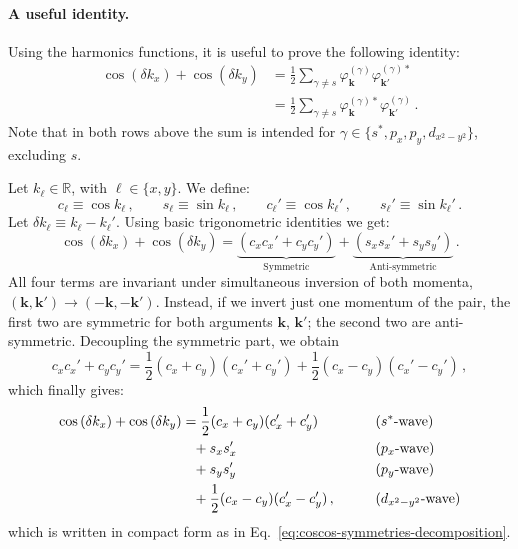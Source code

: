 \paragraph{A useful identity.}

Using the harmonics functions, it is useful to prove the following identity:
\begin{align} 
	\cos \left( \delta k_x \right)	+ \cos \left( \delta k_y  \right) &= \frac 1 2 \sum_{\gamma \neq s} \varphi_\mathbf{k}^{(\gamma)} \varphi_{\mathbf{k}'}^{(\gamma)*} \label{eq:coscos-symmetries-decomposition} \\
	&= \frac 1 2 \sum_{\gamma \neq s} \varphi_\mathbf{k}^{(\gamma)*} \varphi_{\mathbf{k}'}^{(\gamma)} \, .
\end{align}
Note that in both rows above the sum is intended for $\gamma \in \lbrace s^*, p_x, p_y, d_{x^2-y^2} \rbrace$, excluding $s$.

\begin{tabproof}

	Let $k_\ell \in \mathbb{R}$, with $\ell \in \lbrace x, y \rbrace$. We define:
	\[
		c_\ell \equiv \cos k_\ell \, ,
		\qquad
		s_\ell \equiv \sin k_\ell \, ,
		\qquad
		c_\ell' \equiv \cos	k_\ell' \, ,
		\qquad
		s_\ell' \equiv \sin k_\ell' \, .
	\]
	Let $\delta k_\ell \equiv k_\ell - k_\ell'$. Using basic trigonometric identities we get:
	\begin{equation}\label{eq:sym-asym-couplings-gap}
		\cos \left( \delta k_x \right)	+ \cos \left( \delta k_y \right) = 
		\underbrace{
			\left(c_x c_x' + c_y c_y' \right) 
		}_\text{Symmetric}
		+ \underbrace{
			\left(s_x s_x' + s_y s_y' \right)
		}_\text{Anti-symmetric} \, .
	\end{equation}
	All four terms are invariant under simultaneous inversion of both momenta, $(\mathbf{k},\mathbf{k}') \to (-\mathbf{k},-\mathbf{k}')$. Instead, if we invert just one momentum of the pair, the first two are symmetric for both arguments $\mathbf{k}$, $\mathbf{k}'$; the second two are anti-symmetric. Decoupling the symmetric part, we obtain
	\[
		c_x c_x' + c_y c_y' = \frac{1}{2} (c_x + c_y)(c_x' + c_y') + \frac{1}{2} (c_x - c_y)(c_x' - c_y') \, ,
	\]
	which finally gives:
	\[
	\begin{aligned}
		\cos \left( \delta k_x \right)	+ \cos \left( \delta k_y  \right) &= \frac{1}{2}  (c_x + c_y)(c_x' + c_y') &&\qquad\text{($s^*$-wave)} \\
		&\hphantom{=}+ s_x s_x' &&\qquad\text{($p_x$-wave)} \\
		&\hphantom{=}+ s_y s_y' &&\qquad\text{($p_y$-wave)} \\
		&\hphantom{=}+ \frac{1}{2} (c_x - c_y)(c_x' - c_y') \, , &&\qquad\text{($d_{x^2-y^2}$-wave)}
	\end{aligned}
	\]
	which is written in compact form as in Eq.~\eqref{eq:coscos-symmetries-decomposition}.
\end{tabproof}

